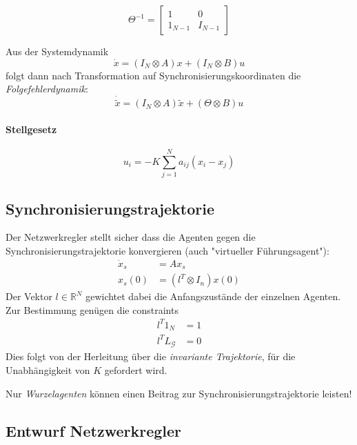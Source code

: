 \begin{equation}
    \Theta^{-1} = \begin{bmatrix}
        1 & 0 \\
        1_{N-1} & I_{N-1}
    \end{bmatrix}    
\end{equation}

Aus der Systemdynamik
\begin{equation}
    \dot{x} = (I_N \otimes A) x + (I_N \otimes B)u
\end{equation}
folgt dann nach Transformation auf Synchronisierungskoordinaten die
\emph{Folgefehlerdynamik}:
\begin{equation}
    \dot{\tilde{x}} = (I_N \otimes A) \tilde{x} + (\Theta \otimes B)u
\end{equation}

\paragraph{Stellgesetz}
\begin{equation}
    u_i = -K \sum_{j=1}^N a_{ij}(x_i-x_j)
\end{equation}

\subsection{Synchronisierungstrajektorie}
Der Netzwerkregler stellt sicher dass die Agenten gegen die Synchronisierungstrajektorie
konvergieren (auch "virtueller Führungsagent"):
\begin{align}
    \dot{x}_s &= Ax_s \\
    x_s(0) &= (l^T \otimes I_n) x(0)
\end{align}
Der Vektor $l \in \mathbb{R}^N$ gewichtet dabei die Anfangszustände der einzelnen
Agenten.
Zur Bestimmung genügen die constraints 
\begin{align}
    l^T 1_N &= 1 \\
    l^T L_\mathcal{G} &= 0
\end{align}
Dies folgt von der Herleitung über die \emph{invariante Trajektorie}, für die
Unabhängigkeit von $K$ gefordert wird.

Nur \emph{Wurzelagenten} können einen Beitrag zur 
Synchronisierungstrajektorie leisten!

\subsection{Entwurf Netzwerkregler}

